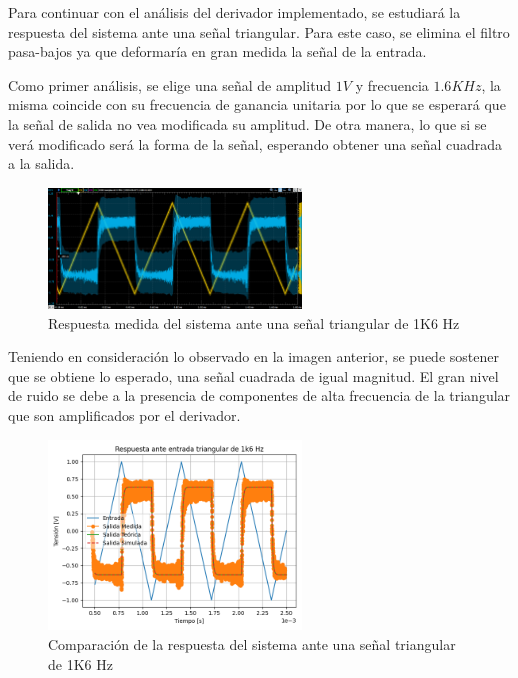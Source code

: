 Para continuar con el análisis del derivador implementado, se estudiará
la respuesta del sistema ante una señal triangular. Para este caso,
se elimina el filtro pasa-bajos ya que deformaría en gran medida 
la señal de la entrada. \par 
Como primer análisis, se elige una señal de amplitud $1V$ y frecuencia 
$1.6 KHz$, la misma coincide con su frecuencia de ganancia unitaria por lo que
se esperará que la señal de salida no vea modificada su amplitud. De otra manera,
lo que si se verá modificado será la forma de la señal, esperando obtener
una señal cuadrada a la salida.

\begin{figure}[H]
    \centering
    \includegraphics[width=0.6\textwidth]{../Ejercicio3-CircuitoIntegradoresyDerivadores/Imagenes/Derivador/trian_1k6.png}
    \caption{Respuesta medida del sistema ante una señal triangular de 1K6 Hz}

\end{figure}
Teniendo en consideración lo observado en la imagen anterior, se puede sostener que se obtiene 
lo esperado, una señal cuadrada de igual magnitud. El gran nivel de ruido se debe a la presencia 
de componentes de alta frecuencia de la  triangular que son amplificados por el derivador. 

\begin{figure}[H]
    \centering
    \includegraphics[width=0.6\textwidth]{../Ejercicio3-CircuitoIntegradoresyDerivadores/Imagenes/Derivador/rta_triangular_1k6.png}
    \caption{Comparación de la respuesta del sistema ante una señal triangular de 1K6 Hz}

\end{figure}

